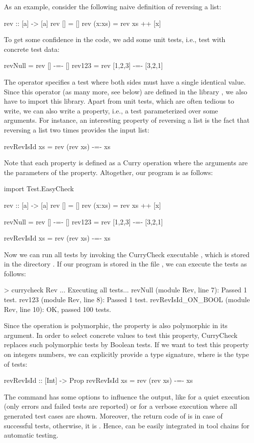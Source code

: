 As an example, consider the following naive definition of
reversing a list:
\begin{curry}
rev :: [a] -> [a]
rev []     = []
rev (x:xs) = rev xs ++ [x]
\end{curry}
To get some confidence in the code, we add some unit tests,
i.e., test with concrete test data:
\begin{curry}
revNull = rev []      -=- []
rev123  = rev [1,2,3] -=- [3,2,1]
\end{curry}
The operator \ccode{-=-} specifies a test where both sides must
have a single identical value. Since this operator (as many more, see below)
are defined in the library ,
we also have to import this library.
Apart from unit tests, which are often tedious to write,
we can also write a property, i.e., a test parameterized over
some arguments. For instance, an interesting property of reversing a list
is the fact that reversing a list two times provides the input list:
\begin{curry}
revRevIsId xs = rev (rev xs) -=- xs
\end{curry}
Note that each property is defined as a Curry operation
where the arguments are the parameters of the property.
Altogether, our program is as follows:
\begin{curry}
import Test.EasyCheck

rev :: [a] -> [a]
rev []     = []
rev (x:xs) = rev xs ++ [x]

revNull = rev []      -=- []
rev123  = rev [1,2,3] -=- [3,2,1]

revRevIsId xs = rev (rev xs) -=- xs
\end{curry}
Now we can run all tests by invoking the CurryCheck executable
, which is stored in the directory .
If our program is stored in the file ,
we can execute the tests as follows:
\begin{curry}
> currycheck Rev
...
Executing all tests...
revNull (module Rev, line 7):
 Passed 1 test.
rev123 (module Rev, line 8):
 Passed 1 test.
revRevIsId_ON_BOOL (module Rev, line 10):
 OK, passed 100 tests.
\end{curry}
Since the operation  is polymorphic,
the property  is also polymorphic in its argument.
In order to select concrete values to test this property,
CurryCheck replaces such polymorphic tests by Boolean tests.
If we want to test this property on integers numbers,
we can explicitly provide a type signature,
where  is the type of tests:
\begin{curry}
revRevIsId :: [Int] -> Prop
revRevIsId xs = rev (rev xs) -=- xs
\end{curry}
The command  has some options to influence
the output, like  for a quiet execution
(only errors and failed tests are reported) or
 for a verbose execution where all generated test cases
are shown.
Moreover, the return code of  is 
in case of successful tests, otherwise, it is .
Hence,  can be easily integrated in tool chains
for automatic testing.

